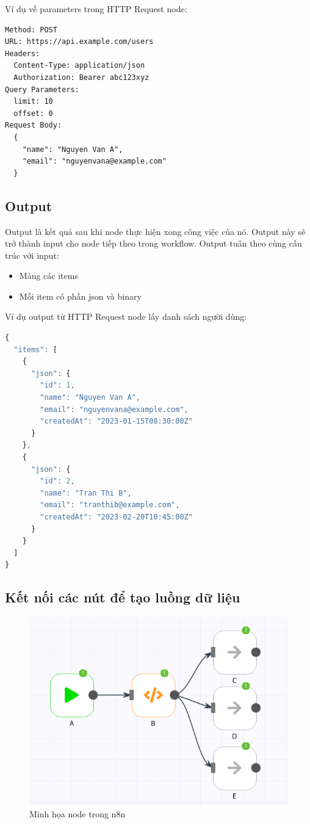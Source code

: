 Ví dụ về parameters trong HTTP Request node:
\begin{lstlisting}   
Method: POST
URL: https://api.example.com/users
Headers:
  Content-Type: application/json
  Authorization: Bearer abc123xyz
Query Parameters:
  limit: 10
  offset: 0
Request Body:
  {
    "name": "Nguyen Van A",
    "email": "nguyenvana@example.com"
  }
\end{lstlisting}


\subsection{Output}
Output là kết quả sau khi node thực hiện xong công việc của nó. Output này sẽ trở thành input cho node tiếp theo trong workflow.
Output tuân theo cùng cấu trúc với input:
\begin{itemize}
    \item Mảng các items
    \item Mỗi item có phần json và binary
\end{itemize}

Ví dụ output từ HTTP Request node lấy danh sách người dùng:

\begin{lstlisting}[language = Javascript]   
{
  "items": [
    {
      "json": {
        "id": 1,
        "name": "Nguyen Van A",
        "email": "nguyenvana@example.com",
        "createdAt": "2023-01-15T08:30:00Z"
      }
    },
    {
      "json": {
        "id": 2,
        "name": "Tran Thi B",
        "email": "tranthib@example.com",
        "createdAt": "2023-02-20T10:45:00Z"
      }
    }
  ]
}
\end{lstlisting}


\subsection{Kết nối các nút để tạo luồng dữ liệu}

\begin{figure}[htbp]
    \centering
    \includegraphics[width=0.6\linewidth]{Chap1-7/node.png}
    \caption{Minh họa node trong n8n}
\end{figure}


